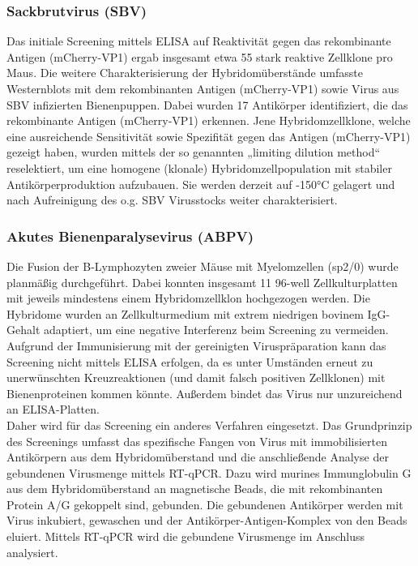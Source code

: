 \subsubsection{Sackbrutvirus (SBV)}
Das initiale Screening mittels ELISA auf Reaktivität gegen das rekombinante Antigen (mCherry-VP1) ergab insgesamt etwa 55 stark reaktive Zellklone pro Maus. 
Die weitere Charakterisierung der Hybridomüberstände umfasste Westernblots mit dem rekombinanten Antigen (mCherry-VP1) sowie Virus aus SBV infizierten Bienenpuppen. Dabei wurden 17 Antikörper identifiziert, die das rekombinante Antigen (mCherry-VP1) erkennen. Jene Hybridomzellklone, welche eine ausreichende Sensitivität sowie Spezifität gegen das Antigen (mCherry-VP1) gezeigt haben, wurden mittels der so genannten „limiting dilution method“ reselektiert, um eine homogene (klonale) Hybridomzellpopulation mit stabiler Antikörperproduktion aufzubauen. Sie werden derzeit auf -150°C gelagert und nach Aufreinigung des o.g. SBV Virusstocks weiter charakterisiert.

\subsubsection{Akutes Bienenparalysevirus (ABPV)}
Die Fusion der B-Lymphozyten zweier Mäuse mit Myelomzellen (sp2/0) wurde planmäßig durchgeführt. Dabei konnten insgesamt 11 96-well Zellkulturplatten mit jeweils mindestens einem Hybridomzellklon hochgezogen werden. Die Hybridome wurden an Zellkulturmedium mit extrem niedrigen bovinem IgG-Gehalt adaptiert, um eine negative Interferenz beim Screening zu vermeiden.
Aufgrund der Immunisierung mit der gereinigten Viruspräparation kann das Screening nicht mittels ELISA erfolgen, da es unter Umständen erneut zu unerwünschten Kreuzreaktionen (und damit falsch positiven Zellklonen) mit Bienenproteinen kommen könnte. Außerdem bindet das Virus nur unzureichend an ELISA-Platten. \\

Daher wird für das Screening ein anderes Verfahren eingesetzt. Das Grundprinzip des Screenings umfasst das spezifische Fangen von Virus mit immobilisierten Antikörpern aus dem Hybridomüberstand und die anschließende Analyse der gebundenen Virusmenge mittels RT-qPCR. Dazu wird murines Immunglobulin G aus dem Hybridomüberstand an magnetische Beads, die mit rekombinanten Protein A/G gekoppelt sind, gebunden. Die gebundenen Antikörper werden mit Virus inkubiert, gewaschen und der Antikörper-Antigen-Komplex von den Beads eluiert. Mittels RT-qPCR wird die gebundene Virusmenge im Anschluss analysiert. \\

